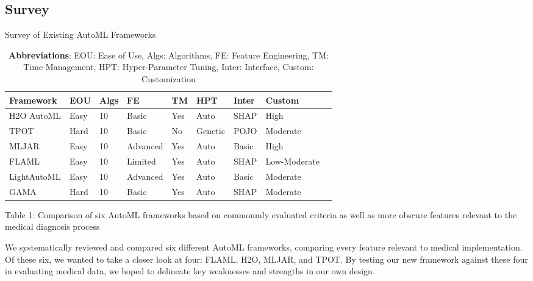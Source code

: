 \documentclass{article}
\begin{document}
\subsection{Survey}

\begin{table}
  \caption{Survey of Existing AutoML Frameworks}
  \label{automl-survey}
  \centering
  \begin{tabular}{lllllllll}
    \toprule
    Framework & EOU & Algs & FE & TM & HPT & Inter & Custom\\
    \midrule
    H2O AutoML & Easy & 10 & Basic & Yes & Auto & SHAP & High\\
    TPOT & Hard & 10 & Basic & No & Genetic & POJO & Moderate\\
    MLJAR & Easy & 10 & Advanced & Yes & Auto & Basic & High\\
    FLAML & Easy & 10 & Limited & Yes & Auto & SHAP & Low-Moderate\\
    LightAutoML & Easy & 10 & Advanced & Yes & Auto & Basic & Moderate\\
    GAMA & Hard & 10 & Basic & Yes & Auto & SHAP & Moderate\\
    \bottomrule
  \end{tabular}
  \captionsetup{font=footnotesize}
  \caption*{\textbf{Abbreviations}: EOU: Ease of Use, Algs: Algorithms, FE: Feature Engineering, TM: Time Management, HPT: Hyper-Parameter Tuning, Inter: Interface, Custom: Customization}
\end{table}
Table 1: Comparison of six AutoML frameworks based on commonmly evaluated criteria as well as more obscure features relevant to the medical diagnosis process 

We systematically reviewed and compared six different AutoML frameworks, comparing every feature relevant to medical implementation. Of these six, we wanted to take a closer look at four: FLAML, H2O, MLJAR, and TPOT. By testing our new framework against these four in evaluating medical data, we hoped to delineate key weaknesses and strengths in our own design. 
\end{document}
